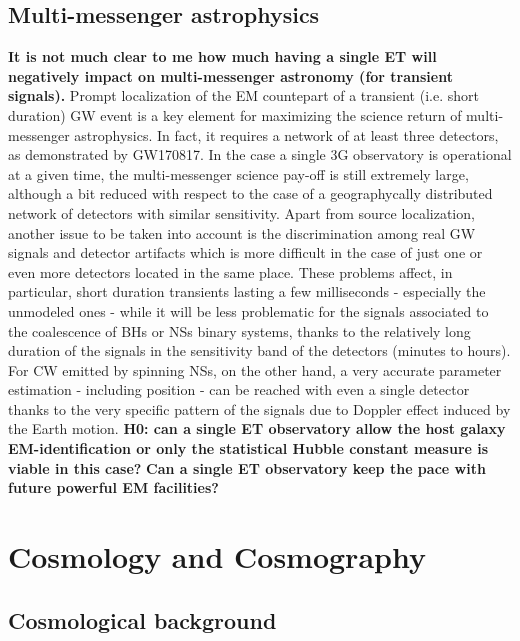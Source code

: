 \subsection{Multi-messenger astrophysics}
{\bf It is not much clear to me how much having a single ET will negatively impact on multi-messenger astronomy (for transient signals).}
Prompt localization of the EM countepart of a transient (i.e. short duration) GW event is a key element for maximizing the science return of multi-messenger astrophysics. In fact, it requires a network of at least three detectors, as demonstrated by GW170817. In the case a single 3G observatory is operational at a given time, the multi-messenger science pay-off is still extremely large, although a bit reduced with respect to the case of a geographycally distributed network of detectors with similar sensitivity.
Apart from source localization, another issue to be taken into account is the discrimination among real GW signals and detector artifacts which is more difficult in the case of just one or even more detectors located in the same place. 
These problems affect, in particular, short duration transients lasting a few milliseconds - especially the unmodeled ones - while it will be less problematic for the signals associated to the coalescence of BHs or NSs binary systems, thanks to the relatively long duration of the signals in the sensitivity band of the detectors (minutes to hours). For CW emitted by spinning NSs, on the other hand, a very accurate parameter estimation - including position - can be reached with even a single detector thanks to the very specific pattern of the signals due to Doppler effect induced by the Earth motion.  
{\bf H0: can a single ET observatory allow the host galaxy EM-identification or only the statistical Hubble constant measure is viable in this case?}
{\bf Can a single ET observatory keep the pace with future powerful EM facilities?}   


     
\section{Cosmology and Cosmography}\label{sec:cosmos}


\subsection{Cosmological background}

